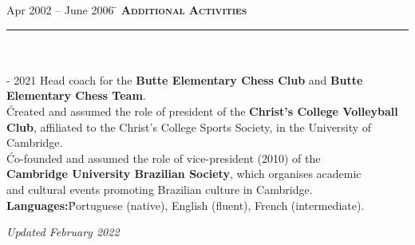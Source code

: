 \documentclass[11pt,a4paper]{article}
\begin{document}
\begin{tabbing}
Apr 2002 -- June 2006 \=\kill
\> \textbf{\large{\textsc{Additional Activities}}} \\
\> \noindent\rule{11cm}{1pt}\\
\\
 - 2021 \' Head coach for the \textbf{Butte Elementary Chess Club} and \textbf{Butte Elementary Chess Team}. \\[2mm]
  \' Created and assumed the role of president of the \textbf{Christ's College Volleyball} \\ 
\> \textbf{Club}, affiliated to the Christ's College Sports Society, in the University of \\ \> Cambridge. \\ [2mm]
 \' Co-founded and assumed the role of vice-president (2010)
of the \\ \> \textbf{Cambridge University Brazilian Society}, which organises academic \\ 
\>and cultural events promoting Brazilian culture in Cambridge. \\ [5mm]
\> \textbf{Languages:}\' Portuguese (native), English (fluent), French (intermediate). \\  
\end{tabbing}
\vspace*{\fill}
\hspace{3.5cm} \textit{Updated February 2022}
\end{document}
